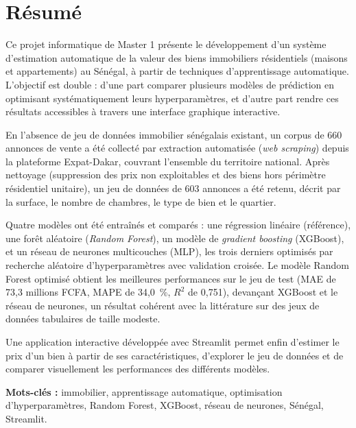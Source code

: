 \chapter*{Résumé}

Ce projet informatique de Master 1 présente le développement d'un système d'estimation
automatique de la valeur des biens immobiliers résidentiels (maisons et appartements) au
Sénégal, à partir de techniques d'apprentissage automatique. L'objectif est double : d'une
part comparer plusieurs modèles de prédiction en optimisant systématiquement leurs
hyperparamètres, et d'autre part rendre ces résultats accessibles à travers une interface
graphique interactive.

En l'absence de jeu de données immobilier sénégalais existant, un corpus de 660 annonces de
vente a été collecté par extraction automatisée (\emph{web scraping}) depuis la plateforme
Expat-Dakar, couvrant l'ensemble du territoire national. Après nettoyage (suppression des prix
non exploitables et des biens hors périmètre résidentiel unitaire), un jeu de données de 603
annonces a été retenu, décrit par la surface, le nombre de chambres, le type de bien et le
quartier.

Quatre modèles ont été entraînés et comparés : une régression linéaire (référence), une
forêt aléatoire (\emph{Random Forest}), un modèle de \emph{gradient boosting} (XGBoost), et un
réseau de neurones multicouches (MLP), les trois derniers optimisés par recherche
aléatoire d'hyperparamètres avec validation croisée. Le modèle Random Forest optimisé obtient
les meilleures performances sur le jeu de test (MAE de 73,3 millions FCFA, MAPE de 34,0~\%,
$R^2$ de 0,751), devançant XGBoost et le réseau de neurones, un résultat cohérent avec la
littérature sur des jeux de données tabulaires de taille modeste.

Une application interactive développée avec Streamlit permet enfin d'estimer le prix d'un bien
à partir de ses caractéristiques, d'explorer le jeu de données et de comparer visuellement les
performances des différents modèles.

\vspace{0.5cm}
\noindent\textbf{Mots-clés :} immobilier, apprentissage automatique, optimisation
d'hyperparamètres, Random Forest, XGBoost, réseau de neurones, Sénégal, Streamlit.
